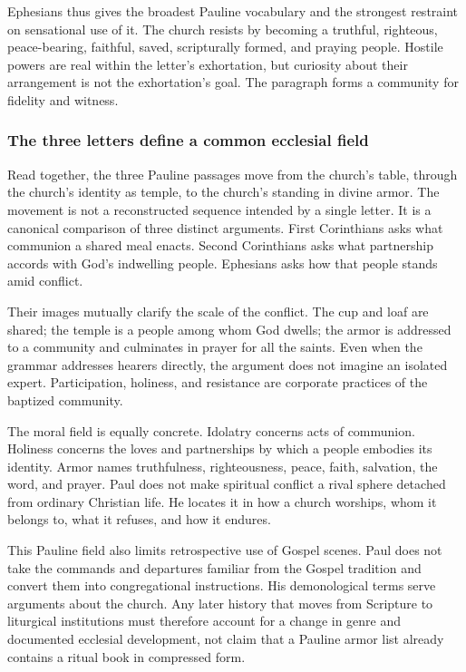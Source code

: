 Ephesians thus gives the broadest Pauline vocabulary and the strongest
restraint on sensational use of it. The church resists by becoming a truthful,
righteous, peace-bearing, faithful, saved, scripturally formed, and praying
people. Hostile powers are real within the letter's exhortation, but curiosity
about their arrangement is not the exhortation's goal. The paragraph forms a
community for fidelity and witness.

\subsubsection{The three letters define a common ecclesial field}

Read together, the three Pauline passages move from the church's table, through
the church's identity as temple, to the church's standing in divine armor.
The movement is not a reconstructed sequence intended by a single letter.
It is a canonical comparison of three distinct arguments. First Corinthians
asks what communion a shared meal enacts. Second Corinthians asks what
partnership accords with God's indwelling people. Ephesians asks how that
people stands amid conflict.

Their images mutually clarify the scale of the conflict. The cup and loaf are
shared; the temple is a people among whom God dwells; the armor is addressed
to a community and culminates in prayer for all the saints. Even when the
grammar addresses hearers directly, the argument does not imagine an isolated
expert. Participation, holiness, and resistance are corporate practices of
the baptized community.

The moral field is equally concrete. Idolatry concerns acts of communion.
Holiness concerns the loves and partnerships by which a people embodies its
identity. Armor names truthfulness, righteousness, peace, faith, salvation,
the word, and prayer. Paul does not make spiritual conflict a rival sphere
detached from ordinary Christian life. He locates it in how a church worships,
whom it belongs to, what it refuses, and how it endures.

This Pauline field also limits retrospective use of Gospel scenes. Paul does
not take the commands and departures familiar from the Gospel tradition and
convert them into congregational instructions. His demonological terms serve
arguments about the church. Any later history that moves from Scripture to
liturgical institutions must therefore account for a change in genre and
documented ecclesial development, not claim that a Pauline armor list already
contains a ritual book in compressed form.

